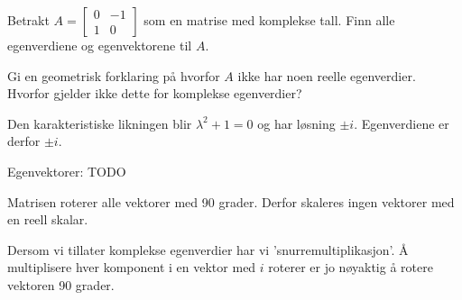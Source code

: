 

\begin{oppgave}
\begin{punkt}
Betrakt $A=\begin{bmatrix}
0 & -1\\
1 & 0
\end{bmatrix}$ som en matrise med komplekse tall. Finn alle egenverdiene og egenvektorene til $A$.
\end{punkt}

\begin{punkt}
Gi en geometrisk forklaring på hvorfor $A$ ikke har noen reelle egenverdier. Hvorfor gjelder ikke dette for komplekse egenverdier?
\end{punkt}

\end{oppgave}

\begin{losning}

\begin{punkt}
Den karakteristiske likningen blir $\lambda^2+1=0$ og har løsning $\pm i$. Egenverdiene er derfor $\pm i$.

Egenvektorer: TODO

\end{punkt}

\begin{punkt}
Matrisen roterer alle vektorer med 90 grader. Derfor skaleres ingen vektorer med en reell skalar.

\noindent
Dersom vi tillater komplekse egenverdier har vi 'snurremultiplikasjon'. Å multiplisere hver komponent i en vektor med $i$ roterer er jo nøyaktig å rotere vektoren 90 grader.
\end{punkt}
\end{losning}


